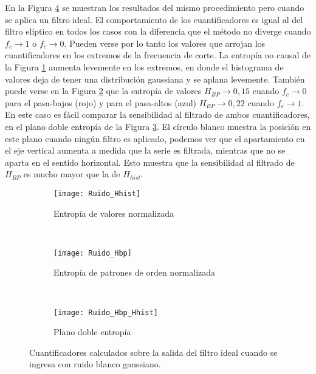 En la Figura \ref{fig:ideal} se muestran los resultados del mismo procedimiento pero cuando se aplica un filtro ideal.
El comportamiento de los cuantificadores es igual al del filtro elíptico en todos los casos con la diferencia que el método no diverge cuando $f_c\to1$ o $f_c\to0$.
Pueden verse por lo tanto los valores que arrojan los cuantificadores en los extremos de la frecuencia de corte.
La entropía no causal de la Figura \ref{subfig:ideal_Hhist} aumenta levemente en los extremos, en donde el histograma de valores deja de tener una distribución gaussiana y se aplana levemente.
También puede verse en la Figura \ref{subfig:ideal_Hbp} que la entropía de valores $H_{BP}\to0,15$ cuando $f_c\to0$ para el pasa-bajos (rojo) y para el pasa-altos (azul) $H_{BP}\to0,22$ cuando $f_c\to1$.
En este caso es fácil comparar la sensibilidad al filtrado de ambos cuantificadores, en el plano doble entropía de la Figura \ref{subfig:ideal_HbpHhist}.
El círculo blanco muestra la posición en este plano cuando ningún filtro es aplicado, podemos ver que el apartamiento en el eje vertical aumenta a medida que la serie es filtrada, mientras que no se aparta en el sentido horizontal.
Esto muestra que la sensibilidad al filtrado de $H_{BP}$ es mucho mayor que la de $H_{hist}$.
%
\begin{figure}[h]
    \centering
    \begin{subfigure}[t]{.49\textwidth}
        \texttt{[image: Ruido\_Hhist]}
        \caption{Entropía de valores normalizada}
        \label{subfig:ideal_Hhist}
    \end{subfigure}
    ~ %
    \begin{subfigure}[t]{.49\textwidth}
        \texttt{[image: Ruido\_Hbp]}
        \caption{Entropía de patrones de orden normalizada}
        \label{subfig:ideal_Hbp}
    \end{subfigure}
    ~ %
    \begin{subfigure}[t]{.49\textwidth}
        \texttt{[image: Ruido\_Hbp\_Hhist]}
        \caption{Plano doble entropía}
        \label{subfig:ideal_HbpHhist}
    \end{subfigure}
    \caption{Cuantificadores calculados sobre la salida del filtro ideal cuando se ingresa con ruido blanco gaussiano.}\label{fig:ideal}
\end{figure}


